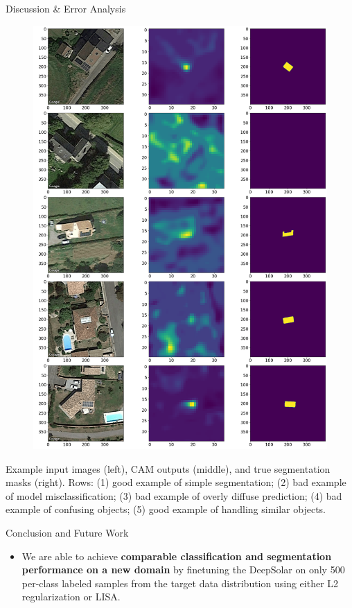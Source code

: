 \documentclass[final]{beamer}
\newlength{\colwidth}
\begin{document}
\begin{frame}[t]
\begin{columns}[t]
\begin{column}{\colwidth}
\begin{block}{Discussion \& Error Analysis}
\begin{minipage}[t]{0.45\linewidth}
\end{minipage}
\hfill %
\begin{minipage}[t]{0.5\linewidth}
\begin{figure}
\centering
\includegraphics[width=\linewidth]{good_bad_examples.png}
\end{figure}
Example input images (left), CAM outputs (middle), and true segmentation masks (right). Rows: (1) good example of simple segmentation; (2) bad example of model misclassification; (3) bad example of overly diffuse prediction; (4) bad example of confusing objects; (5) good example of handling similar objects. 

\end{minipage}
\end{block}

\begin{block}{Conclusion and Future Work}
\begin{itemize}
    \item We are able to achieve \textbf{comparable classification and segmentation performance on a new domain} by finetuning the DeepSolar on only 500 per-class labeled  samples from the target data distribution using either L2 regularization or LISA. \\[20pt]
    

\end{itemize}
\end{block}
\end{column}
\end{columns}
\end{frame}
\end{document}
